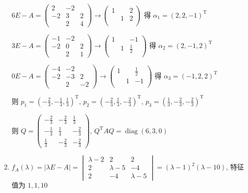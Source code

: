 \begin{enumerate}
			       \( 6E-A = \begin{pmatrix}
				       2  & -2 &   \\
				       -2 & 3  & 2 \\
				          & 2  & 4
			       \end{pmatrix} \rightarrow \begin{pmatrix}
				       1 &   & 2 \\
				         & 1 & 2 \\
				         &   &
			       \end{pmatrix} \) 得 \( \alpha_{1} = (2, 2, -1)^{\mathrm{T}} \)

			       \( 3E-A = \begin{pmatrix}
				       -1 & -2 &   \\
				       -2 & 0  & 2 \\
				          & 2  & 1
			       \end{pmatrix} \rightarrow \begin{pmatrix}
				       1 &   & -1          \\
				         & 1 & \frac{1}{2} \\
				         &   &
			       \end{pmatrix} \) 得 \( \alpha_{2} = (2, -1, 2)^{\mathrm{T}} \)

			       \( 0E-A = \begin{pmatrix}
				       -4 & -2 &    \\
				       -2 & -3 & 2  \\
				          & 2  & -2
			       \end{pmatrix} \rightarrow \begin{pmatrix}
				       1 &   & \frac{1}{2} \\
				         & 1 & -1          \\
				         &   &
			       \end{pmatrix} \) 得 \( \alpha_{3} = (-1, 2, 2)^{\mathrm{T}} \)

			       则 \( p_{1} = \left( -\frac{2}{3}, -\frac{1}{3}, \frac{1}{3} \right)^{\mathrm{T}} \), \( p_{2} = \left( -\frac{2}{3}, \frac{1}{3}, -\frac{2}{3} \right)^{\mathrm{T}} \), \( p_{3} = \left( \frac{1}{3}, -\frac{2}{3}, -\frac{2}{3} \right)^{\mathrm{T}} \)

			       则 \( Q = \begin{pmatrix}
				       -\frac{2}{3} & -\frac{2}{3} & \frac{1}{3}  \\
				       -\frac{1}{3} & \frac{1}{3}  & -\frac{2}{3} \\
				       \frac{1}{3}  & -\frac{2}{3} & -\frac{2}{3}
			       \end{pmatrix} \), \( Q^{\mathrm{T}}AQ = \operatorname{diag}(6, 3, 0) \)
			 \item %
			       \( f_{A}(\lambda) = |\lambda E - A| = \begin{vmatrix}
				       \lambda-2 & 2         & 2         \\
				       2         & \lambda-5 & -4        \\
				       2         & -4        & \lambda-5
			       \end{vmatrix} = (\lambda-1)^{2}(\lambda-10) \), 特征值为 \( 1, 1, 10 \)


\end{enumerate}
